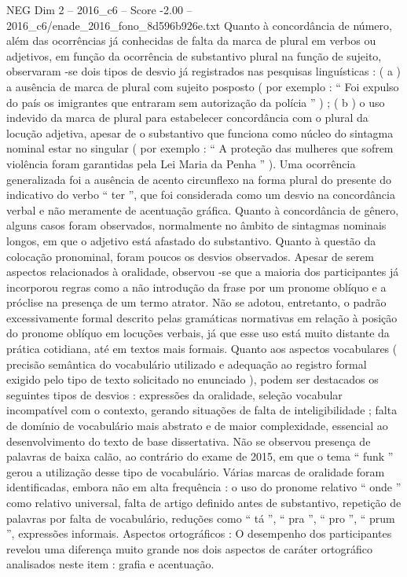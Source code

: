 \begin{textsample}{NEG Dim 2 – 2016\_c6 – Score -2.00 – 2016\_c6/enade\_2016\_fono\_8d596b926e.txt}
Quanto à concordância de número, além das ocorrências já conhecidas de falta da marca de plural em verbos ou adjetivos, em função da ocorrência de substantivo plural na função de sujeito, observaram -se dois tipos de desvio já registrados nas pesquisas linguísticas : ( a ) a ausência de marca de plural com sujeito posposto ( por exemplo : “ Foi expulso do país os imigrantes que entraram sem autorização da polícia ” ) ; ( b ) o uso indevido da marca de plural para estabelecer concordância com o plural da locução adjetiva, apesar de o substantivo que funciona como núcleo do sintagma nominal estar no singular ( por exemplo : “ A proteção das mulheres que sofrem violência foram garantidas pela Lei Maria da Penha ” ).
Uma ocorrência generalizada foi a ausência de acento circunflexo na forma plural do presente do indicativo do verbo “ ter ”, que foi considerada como um desvio na concordância verbal e não meramente de acentuação gráfica.
Quanto à concordância de gênero, alguns casos foram observados, normalmente no âmbito de sintagmas nominais longos, em que o adjetivo está afastado do substantivo.
Quanto à questão da colocação pronominal, foram poucos os desvios observados.
Apesar de serem aspectos relacionados à oralidade, observou -se que a maioria dos participantes já incorporou regras como a não introdução da frase por um pronome oblíquo e a próclise na presença de um termo atrator.
Não se adotou, entretanto, o padrão excessivamente formal descrito pelas gramáticas normativas em relação à posição do pronome oblíquo em locuções verbais, já que esse uso está muito distante da prática cotidiana, até em textos mais formais.
Quanto aos aspectos vocabulares ( precisão semântica do vocabulário utilizado e adequação ao registro formal exigido pelo tipo de texto solicitado no enunciado ), podem ser destacados os seguintes tipos de desvios : expressões da oralidade, seleção vocabular incompatível com o contexto, gerando situações de falta de inteligibilidade ; falta de domínio de vocabulário mais abstrato e de maior complexidade, essencial ao desenvolvimento do texto de base dissertativa.
Não se observou presença de palavras de baixa calão, ao contrário do exame de 2015, em que o tema “ funk ” gerou a utilização desse tipo de vocabulário.
Várias marcas de oralidade foram identificadas, embora não em alta frequência : o uso do pronome relativo “ onde ” como relativo universal, falta de artigo definido antes de substantivo, repetição de palavras por falta de vocabulário, reduções como “ tá ”, “ pra ”, “ pro ”, “ prum ”, expressões informais.
Aspectos ortográficos : O desempenho dos participantes revelou uma diferença muito grande nos dois aspectos de caráter ortográfico analisados neste item : grafia e acentuação.

\end{textsample}
